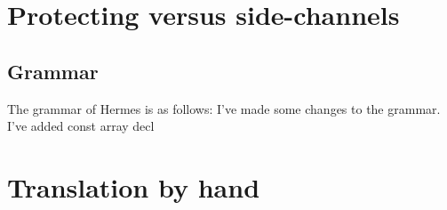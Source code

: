 \section{Protecting versus side-channels}

\subsection{Grammar}
The grammar of Hermes is as follows:
I've made some changes to the grammar. I've added const array decl



\section{Translation by hand}
